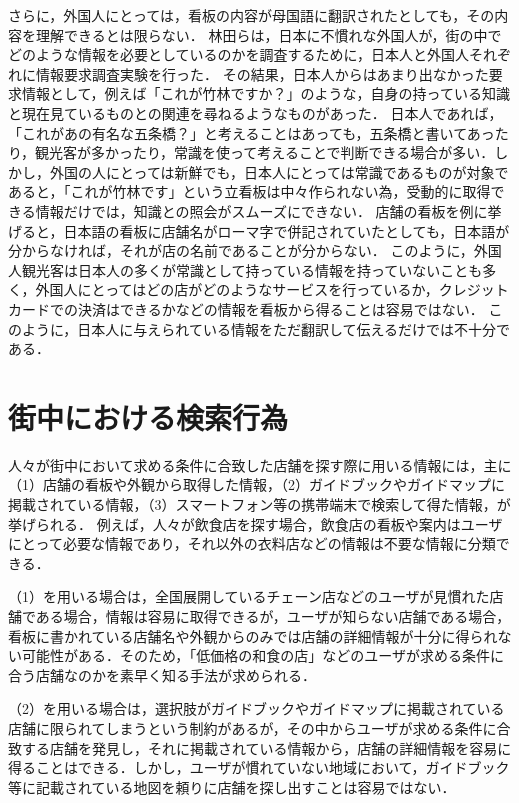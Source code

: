     さらに，外国人にとっては，看板の内容が母国語に翻訳されたとしても，その内容を理解できるとは限らない．
    林田らは，日本に不慣れな外国人が，街の中でどのような情報を必要としているのかを調査するために，日本人と外国人それぞれに情報要求調査実験を行った\cite{Hayashida:2005}．
    その結果，日本人からはあまり出なかった要求情報として，例えば「これが竹林ですか？」のような，自身の持っている知識と現在見ているものとの関連を尋ねるようなものがあった．
    日本人であれば，「これがあの有名な五条橋？」と考えることはあっても，五条橋と書いてあったり，観光客が多かったり，常識を使って考えることで判断できる場合が多い．しかし，外国の人にとっては新鮮でも，日本人にとっては常識であるものが対象であると，「これが竹林です」という立看板は中々作られない為，受動的に取得できる情報だけでは，知識との照会がスムーズにできない．
    店舗の看板を例に挙げると，日本語の看板に店舗名がローマ字で併記されていたとしても，日本語が分からなければ，それが店の名前であることが分からない．
    このように，外国人観光客は日本人の多くが常識として持っている情報を持っていないことも多く，外国人にとってはどの店がどのようなサービスを行っているか，クレジットカードでの決済はできるかなどの情報を看板から得ることは容易ではない．
    このように，日本人に与えられている情報をただ翻訳して伝えるだけでは不十分である．

\section{街中における検索行為}
\label{section:searching_action}
  人々が街中において求める条件に合致した店舗を探す際に用いる情報には，主に（1）店舗の看板や外観から取得した情報，（2）ガイドブックやガイドマップに掲載されている情報，（3）スマートフォン等の携帯端末で検索して得た情報，が挙げられる．
  例えば，人々が飲食店を探す場合，飲食店の看板や案内はユーザにとって必要な情報であり，それ以外の衣料店などの情報は不要な情報に分類できる．

  （1）を用いる場合は，全国展開しているチェーン店などのユーザが見慣れた店舗である場合，情報は容易に取得できるが，ユーザが知らない店舗である場合，看板に書かれている店舗名や外観からのみでは店舗の詳細情報が十分に得られない可能性がある．そのため，「低価格の和食の店」などのユーザが求める条件に合う店舗なのかを素早く知る手法が求められる．

  （2）を用いる場合は，選択肢がガイドブックやガイドマップに掲載されている店舗に限られてしまうという制約があるが，その中からユーザが求める条件に合致する店舗を発見し，それに掲載されている情報から，店舗の詳細情報を容易に得ることはできる．しかし，ユーザが慣れていない地域において，ガイドブック等に記載されている地図を頼りに店舗を探し出すことは容易ではない．

